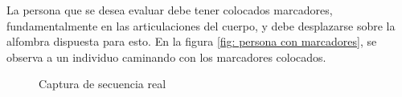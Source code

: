La persona que se desea evaluar debe tener colocados marcadores, fundamentalmente en las articulaciones del cuerpo, y debe desplazarse sobre la alfombra dispuesta para esto. En la figura \ref{fig: persona con marcadores}, se observa a un individuo caminando con los marcadores colocados.

\begin{figure}[ht!]		
        \hspace{0.1cm}
  \caption{Captura de secuencia real}
      \label{fig: captura real}
\end{figure}

